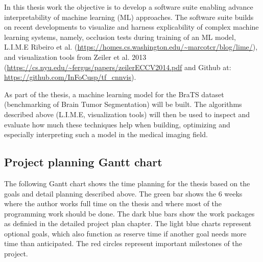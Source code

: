 In this thesis work the objective is to develop a software suite enabling advance interpretability of machine learning (ML) approaches. The software suite builds on recent developments to visualize and harness explicability of complex machine learning systems, namely, occlusion tests during training of an ML model, L.I.M.E Ribeiro et al. (\url{https://homes.cs.washington.edu/~marcotcr/blog/lime/}), and visualization tools from Zeiler et al. 2013 (\url{https://cs.nyu.edu/~fergus/papers/zeilerECCV2014.pdf} and Github at: \url{https://github.com/InFoCusp/tf\_cnnvis}).
 
As part of the thesis, a machine learning model for the BraTS dataset (benchmarking of Brain Tumor Segmentation) will be built. The algorithms described above (L.I.M.E, visualization tools) will then be used to inspect and evaluate how much these techniques help when building, optimizing and especially interpreting such a model in the medical imaging field.

\pagebreak
\subsection{Project planning Gantt chart}

The following Gantt chart shows the time planning for the thesis based on the goals and detail planning described above.
The green bar shows the 6 weeks where the author works full time on the thesis and where most of the programming work should be done.
The dark blue bars show the work packages as definied in the detailed project plan chapter.
The light blue charts represent optional goals, which also function as reserve time if another goal needs more time than anticipated.
The red circles represent important milestones of the project.

